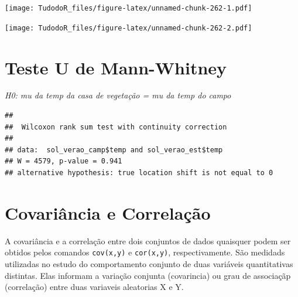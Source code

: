 \documentclass[
]{book}
\newenvironment{Shaded}{\begin{snugshade}}{\end{snugshade}}
\newcommand{\CommentTok}[1]{\textcolor[rgb]{0.56,0.35,0.01}{\textit{#1}}}
\newcommand{\DataTypeTok}[1]{\textcolor[rgb]{0.13,0.29,0.53}{#1}}
\newcommand{\KeywordTok}[1]{\textcolor[rgb]{0.13,0.29,0.53}{\textbf{#1}}}
\newcommand{\NormalTok}[1]{#1}
\newcommand{\OperatorTok}[1]{\textcolor[rgb]{0.81,0.36,0.00}{\textbf{#1}}}
\newcommand{\StringTok}[1]{\textcolor[rgb]{0.31,0.60,0.02}{#1}}
\begin{document}
\begin{Shaded}
\end{Shaded}

\texttt{[image: TudodoR\_files/figure-latex/unnamed-chunk-262-1.pdf]}

\begin{Shaded}
\end{Shaded}

\texttt{[image: TudodoR\_files/figure-latex/unnamed-chunk-262-2.pdf]}

\hypertarget{teste-u-de-mann-whitney}{%
\section{Teste U de Mann-Whitney}\label{teste-u-de-mann-whitney}}

\emph{H0: mu da temp da casa de vegetação = mu da temp do campo}

\begin{Shaded}
\end{Shaded}

\begin{verbatim}
## 
##  Wilcoxon rank sum test with continuity correction
## 
## data:  sol_verao_camp$temp and sol_verao_est$temp
## W = 4579, p-value = 0.941
## alternative hypothesis: true location shift is not equal to 0
\end{verbatim}

\hypertarget{covariuxe2ncia-e-correlauxe7uxe3o}{%
\section{Covariância e Correlação}\label{covariuxe2ncia-e-correlauxe7uxe3o}}

A covariância e a correlação entre dois conjuntos de dados quaisquer podem ser obtidos pelos comandos \texttt{cov(x,y)} e \texttt{cor(x,y)}, respectivamente.
São medidads utilizadas no estudo do comportamento conjunto de duas variáveis quantitativas distintas. Elas informam a variação conjunta (covarincia) ou grau de associaçãp (correlação) entre duas variaveis aleatorias X e Y.
\end{document}
